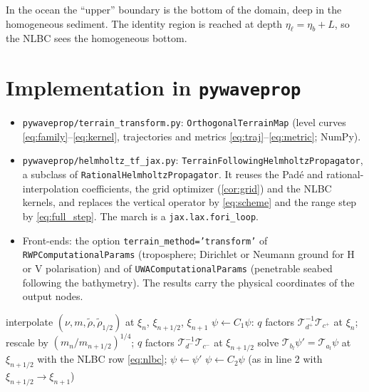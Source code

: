 \documentclass[11pt,a4paper]{article}
\theoremstyle{remark}
\newcommand{\rt}{\tilde\rho}
\newcommand{\het}{\nu}
\newcommand{\etab}{\eta_{b}}
\newcommand{\etal}{\eta_{\ell}}
\begin{document}
In the ocean the ``upper'' boundary is the bottom of the domain, deep in the
homogeneous sediment. The identity region is reached at depth $\etal=\etab+L$,
so the NLBC sees the homogeneous bottom.

\section{Implementation in \texttt{pywaveprop}}\label{sec:impl}

\begin{itemize}
\item \texttt{pywaveprop/terrain\_transform.py}: \texttt{OrthogonalTerrainMap}
(level curves \eqref{eq:family}--\eqref{eq:kernel}, trajectories and metrics
\eqref{eq:traj}--\eqref{eq:metric}; NumPy).
\item \texttt{pywaveprop/helmholtz\_tf\_jax.py}:
\texttt{TerrainFollowingHelmholtzPropagator}, a subclass of
\texttt{RationalHelmholtzPropagator}. It reuses the Pad\'e and
rational-interpolation coefficients, the grid optimizer
(\cref{cor:grid}) and the NLBC kernels, and replaces the vertical operator
by \eqref{eq:scheme} and the range step by \eqref{eq:full_step}. The march is a
\texttt{jax.lax.fori\_loop}.
\item Front-ends: the option \texttt{terrain\_method='transform'} of
\texttt{RWPComputationalParams} (troposphere; Dirichlet or Neumann ground for H
or V polarisation) and of \texttt{UWAComputationalParams} (penetrable seabed
following the bathymetry). The results carry the physical coordinates of the
output nodes.
\end{itemize}

\begin{algorithm}[h]
\caption{One range step of the terrain-following rational propagator}\label{alg:step}
\begin{algorithmic}[1]
\State interpolate $(\het,m,\rt,\rt_{1/2})$ at $\xi_n$, $\xi_{n+1/2}$, $\xi_{n+1}$
\State $\psi\gets C_1\psi$: $q$ factors $\mathcal T_{d^+}^{-1}\mathcal T_{c^+}$ at $\xi_n$; rescale by $(m_n/m_{n+1/2})^{1/4}$; $q$ factors $\mathcal T_{d^-}^{-1}\mathcal T_{c^-}$ at $\xi_{n+1/2}$ \Comment{rows $<\etal$+margin}
\State solve $\mathcal T_{b_l}\psi'=\mathcal T_{a_l}\psi$ at $\xi_{n+1/2}$ with the NLBC row \eqref{eq:nlbc}; $\psi\gets\psi'$
\EndFor
\State $\psi\gets C_2\psi$ (as in line 2 with $\xi_{n+1/2}\to\xi_{n+1}$)
\end{algorithmic}
\end{algorithm}
\end{document}
